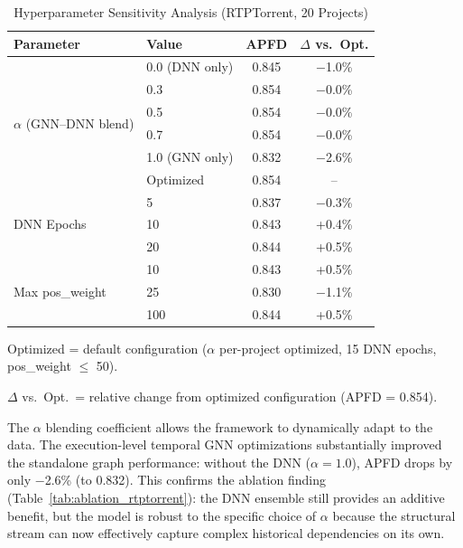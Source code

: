 \begin{table}[!t]
\centering
\caption{Hyperparameter Sensitivity Analysis (RTPTorrent, 20 Projects)}
\label{tab:sensitivity_rtptorrent}
\footnotesize
\begin{threeparttable}
\begin{tabular}{llcc}
\toprule
\textbf{Parameter} & \textbf{Value} & \textbf{APFD} & \textbf{$\Delta$ vs.\ Opt.} \\
\midrule
\multirow{6}{*}{$\alpha$ (GNN--DNN blend)} & 0.0 (DNN only) & 0.845 & $-$1.0\% \\
 & 0.3 & 0.854 & $-$0.0\% \\
 & 0.5 & 0.854 & $-$0.0\% \\
 & 0.7 & 0.854 & $-$0.0\% \\
 & 1.0 (GNN only) & 0.832 & $-$2.6\% \\
 & Optimized & 0.854 & -- \\
\midrule
\multirow{3}{*}{DNN Epochs} & 5 & 0.837 & $-$0.3\% \\
 & 10 & 0.843 & +0.4\% \\
 & 20 & 0.844 & +0.5\% \\
\midrule
\multirow{3}{*}{Max pos\_weight} & 10 & 0.843 & +0.5\% \\
 & 25 & 0.830 & $-$1.1\% \\
 & 100 & 0.844 & +0.5\% \\
\bottomrule
\end{tabular}
\begin{tablenotes}
\small
\item Optimized = default configuration ($\alpha$ per-project optimized, 15 DNN epochs, pos\_weight $\leq$ 50).
\item $\Delta$ vs.\ Opt.\ = relative change from optimized configuration (APFD = 0.854).
\end{tablenotes}
\end{threeparttable}
\end{table}

The $\alpha$ blending coefficient allows the framework to dynamically adapt to the data. The execution-level temporal GNN optimizations substantially improved the standalone graph performance: without the DNN ($\alpha = 1.0$), APFD drops by only $-$2.6\% (to 0.832). This confirms the ablation finding (Table~\ref{tab:ablation_rtptorrent}): the DNN ensemble still provides an additive benefit, but the model is robust to the specific choice of $\alpha$ because the structural stream can now effectively capture complex historical dependencies on its own.

